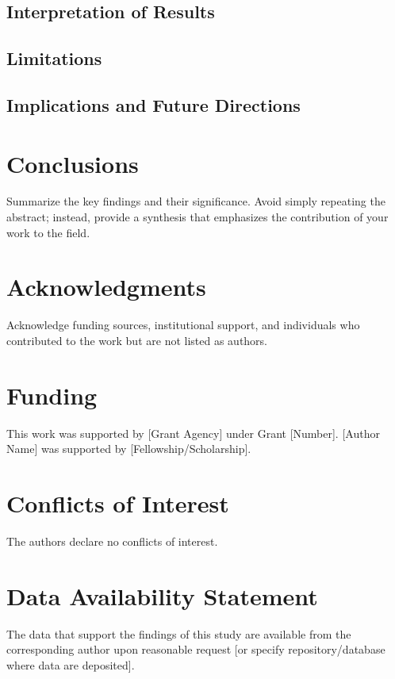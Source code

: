 \documentclass[12pt,a4paper]{article}
\begin{document}
\subsection{Interpretation of Results}


\subsection{Limitations}

\subsection{Implications and Future Directions}



\section{Conclusions}

Summarize the key findings and their significance. Avoid simply repeating the abstract; instead, provide a synthesis that emphasizes the contribution of your work to the field.


\section*{Acknowledgments}

Acknowledge funding sources, institutional support, and individuals who contributed to the work but are not listed as authors.


\section*{Funding}

This work was supported by [Grant Agency] under Grant [Number]. [Author Name] was supported by [Fellowship/Scholarship].


\section*{Conflicts of Interest}

The authors declare no conflicts of interest.


\section*{Data Availability Statement}

The data that support the findings of this study are available from the corresponding author upon reasonable request [or specify repository/database where data are deposited].





\end{document}
